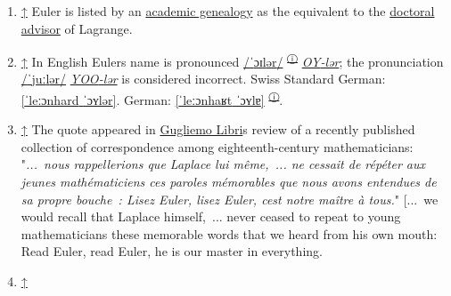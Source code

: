 \begin{enumerate}
\tightlist
\item
  {{\href{https://en.wikipedia.org/wiki/Leonhard_Euler\#cite_ref-2}{{↑}}} {Euler is listed by an \href{https://en.wikipedia.org/wiki/Academic_genealogy}{academic genealogy} as the equivalent to the \href{https://en.wikipedia.org/wiki/Doctoral_advisor}{doctoral advisor} of Lagrange.}}
\item
  {{\href{https://en.wikipedia.org/wiki/Leonhard_Euler\#cite_ref-4}{{↑}}} {In English Euler\textquotesingle s name is pronounced {\foreignlanguage{english}{\href{https://en.wikipedia.org/wiki/Help:IPA/English}{/{{ˈ}{ɔɪ}{l}{ər}}/}}{ }{{}\textsuperscript{\href{https://en.wikipedia.org/wiki/File:LL-Q1860_(eng)-Flame,_not_lame-Leonhard_Euler.wav}{ⓘ}}}} \href{https://en.wikipedia.org/wiki/Help:Pronunciation_respelling_key}{\emph{{OY}-lər}}; the pronunciation {\foreignlanguage{english}{\href{https://en.wikipedia.org/wiki/Help:IPA/English}{/{{ˈ}{juː}{l}{ər}}/}}} \href{https://en.wikipedia.org/wiki/Help:Pronunciation_respelling_key}{\emph{{YOO}-lər}} is considered incorrect. {Swiss Standard German:} \foreignlanguage{nswissgerman}{\href{https://en.wikipedia.org/wiki/Help:IPA/Standard_German}{{{[}}ˈleːɔnhard{ }ˈɔʏlər{{]}}}}. {German:} \foreignlanguage{ngerman}{\href{https://en.wikipedia.org/wiki/Help:IPA/Standard_German}{{{[}}ˈleːɔnhaʁt{ }ˈɔʏlɐ{{]}}}} {{\href{https://upload.wikimedia.org/wikipedia/commons/transcoded/e/ef/De-Leonhard_Euler.ogg/De-Leonhard_Euler.ogg.mp3}{{}{}{}}}\textsuperscript{\href{https://en.wikipedia.org/wiki/File:De-Leonhard_Euler.ogg}{ⓘ}}}. }}
\item
  {{\href{https://en.wikipedia.org/wiki/Leonhard_Euler\#cite_ref-fn2_16-0}{{↑}}} {
  The quote appeared in \href{https://en.wikipedia.org/wiki/Gugliemo_Libri}{Gugliemo Libri}\textquotesingle s review of a recently published collection of correspondence among eighteenth-century mathematicians: "{\emph{...{{~}}nous rappellerions que Laplace lui même,{{~}}... ne cessait de répéter aux jeunes mathématiciens ces paroles mémorables que nous avons entendues de sa propre bouche{~}: \textquotesingle Lisez Euler, lisez Euler, c\textquotesingle est notre maître à tous.\textquotesingle{}}}{"} {[}...{{~}}we would recall that Laplace himself,{{~}}... never ceased to repeat to young mathematicians these memorable words that we heard from his own mouth: \textquotesingle Read Euler, read Euler, he is our master in everything.\textquotesingle{]}}}
\item
  {{\href{https://en.wikipedia.org/wiki/Leonhard_Euler\#cite_ref-fn3_19-0}{{↑}}} {
}}
\end{enumerate}
